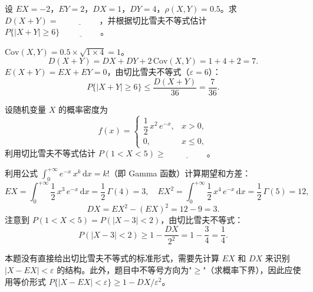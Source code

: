 \documentclass[lang=cn,11pt]{elegantbook}
\begin{document}
\begin{exercise}\label{exer:5-chebyshev-sum}
设 \(EX = -2\)，\(EY = 2\)，\(DX = 1\)，\(DY = 4\)，\(\rho(X,Y) = 0.5\)。求 \(D(X+Y) =\,\underline{\hspace{2cm}}\)，并根据切比雪夫不等式估计 \(P\{|X+Y| \geq 6\}\,\underline{\hspace{2cm}}\)。
\end{exercise}
\begin{solution}
\(\mathrm{Cov}(X,Y) = 0.5 \times \sqrt{1 \times 4} = 1\)。
\[
D(X+Y) = DX + DY + 2\,\mathrm{Cov}(X,Y) = 1 + 4 + 2 = 7.
\]
\(E(X+Y) = EX + EY = 0\)，由切比雪夫不等式（\(\varepsilon = 6\)）：
\[
P\{|X+Y| \geq 6\} \leq \frac{D(X+Y)}{36} = \frac{7}{36}.
\]
\end{solution}



\begin{exercise}\label{exer:5-chebyshev-pdf}
设随机变量 \(X\) 的概率密度为
\[
f(x) = \begin{cases} \dfrac{1}{2}\,x^2\,e^{-x}, & x > 0, \\[4pt] 0, & x \leq 0, \end{cases}
\]
利用切比雪夫不等式估计 \(P(1 < X < 5) \geq\,\underline{\hspace{2cm}}\)。
\end{exercise}
\begin{solution}
利用公式 \(\displaystyle\int_0^{+\infty} e^{-x}\,x^k\,\mathrm{d}x = k!\)（即 Gamma 函数）计算期望和方差：
\[
EX = \int_0^{+\infty} \frac{1}{2}\,x^3\,e^{-x}\,\mathrm{d}x = \frac{1}{2}\,\Gamma(4) = 3,\quad
EX^2 = \int_0^{+\infty} \frac{1}{2}\,x^4\,e^{-x}\,\mathrm{d}x = \frac{1}{2}\,\Gamma(5) = 12,
\]
\[
DX = EX^2 - (EX)^2 = 12 - 9 = 3.
\]
注意到 \(P(1 < X < 5) = P(|X - 3| < 2)\)，由切比雪夫不等式：
\[
P(|X - 3| < 2) \geq 1 - \frac{DX}{2^2} = 1 - \frac{3}{4} = \frac{1}{4}.
\]

\begin{note}
本题没有直接给出切比雪夫不等式的标准形式，需要先计算 \(EX\) 和 \(DX\) 来识别 \(|X - EX| < \varepsilon\) 的结构。此外，题目中不等号方向为"\(\geq\)"（求概率下界），因此应使用等价形式 \(P\{|X-EX|<\varepsilon\} \geq 1 - DX/\varepsilon^2\)。
\end{note}
\end{solution}
\end{document}
